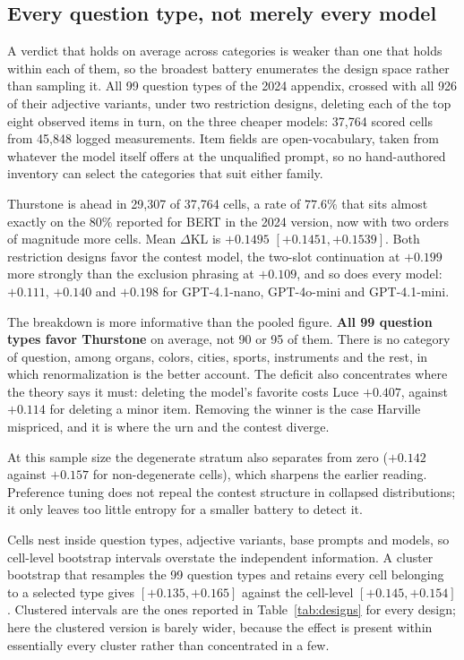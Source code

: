 \documentclass[11pt]{article}
\begin{document}
\subsection{Every question type, not merely every model}
\label{sec:sweep}

A verdict that holds on average across categories is weaker than one that
holds within each of them, so the broadest battery enumerates the design
space rather than sampling it. All 99 question types of the 2024 appendix,
crossed with all 926 of their adjective variants, under two restriction
designs, deleting each of the top eight observed items in turn, on the three
cheaper models: 37{,}764 scored cells from 45{,}848 logged measurements.
Item fields are open-vocabulary, taken from whatever the model itself offers
at the unqualified prompt, so no hand-authored inventory can select the
categories that suit either family.

Thurstone is ahead in 29{,}307 of 37{,}764 cells, a rate of $77.6\%$ that
sits almost exactly on the $80\%$ reported for BERT in the 2024 version,
now with two orders of magnitude more cells. Mean $\Delta$KL is $+0.1495$
$[+0.1451, +0.1539]$. Both restriction designs favor the contest model, the
two-slot continuation at $+0.199$ more strongly than the exclusion phrasing
at $+0.109$, and so does every model: $+0.111$, $+0.140$ and $+0.198$ for
GPT-4.1-nano, GPT-4o-mini and GPT-4.1-mini.

The breakdown is more informative than the pooled figure. \textbf{All 99
question types favor Thurstone} on average, not 90 or 95 of them. There is
no category of question, among organs, colors, cities, sports, instruments
and the rest, in which renormalization is the better account. The deficit
also concentrates where the theory says it must:
deleting the model's favorite costs Luce $+0.407$, against $+0.114$ for
deleting a minor item. Removing the winner is the case Harville
\cite{harville1973} mispriced, and it is where the urn and the
contest diverge.

At this sample size the degenerate stratum also separates from zero
($+0.142$ against $+0.157$ for non-degenerate cells), which sharpens the
earlier reading. Preference tuning does not repeal the contest structure in
collapsed distributions; it only leaves too little entropy for a smaller
battery to detect it.

Cells nest inside question types, adjective variants, base prompts and models,
so cell-level bootstrap intervals overstate the independent information. A
cluster bootstrap that resamples the 99 question types and retains every cell
belonging to a selected type gives $[+0.135, +0.165]$ against the cell-level
$[+0.145, +0.154]$. Clustered intervals are the ones reported in
Table~\ref{tab:designs} for every design; here the clustered version is barely
wider, because the effect is present within essentially every cluster rather
than concentrated in a few.
\end{document}
